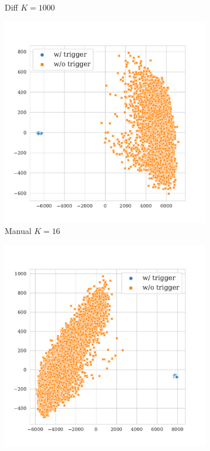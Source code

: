 \begin{figure}[!ht]
\begin{subfigure}{.33\textwidth}
  \caption{Diff $K = 1000$}
  \label{fig:mnli_mismatched_diff_k1000_embed}
\end{subfigure}
\begin{subfigure}{.33\textwidth}
  \centering
  \includegraphics[width=\linewidth]{figures/evaluation_media/mnli-mismatched-roberta-large-visual-backdoor-manual-k16-seed42-poison-cf-1050.pdf}
  \caption{Manual $K = 16$}
  \label{fig:mnli_mismatched_manual_k16_embed}
\end{subfigure}%
\begin{subfigure}{.33\textwidth}
  \centering
  \includegraphics[width=\linewidth]{figures/evaluation_media/mnli-mismatched-roberta-large-visual-backdoor-manual-k100-seed42-poison-cf-110.pdf}

\end{subfigure}
\end{figure}
